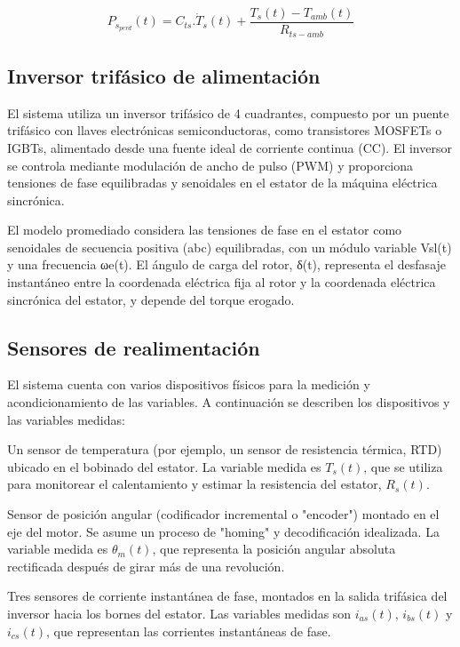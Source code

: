 \documentclass{article}
\begin{document}
    \begin{equation}
        P_{s_{perd}}(t) = C_{ts}.\dot{T}_{s}(t) + \frac{T_{s}(t)-T_{amb}(t)}{R_{ts-amb}}
    \end{equation}

\subsection{Inversor trifásico de alimentación}

El sistema utiliza un inversor trifásico de 4 cuadrantes, compuesto por un puente trifásico con llaves 
electrónicas semiconductoras, como transistores MOSFETs o IGBTs, alimentado desde una fuente ideal de 
corriente continua (CC). El inversor se controla mediante modulación de ancho de pulso (PWM) y proporciona 
tensiones de fase equilibradas y senoidales en el estator de la máquina eléctrica sincrónica.

El modelo promediado considera las tensiones de fase en el estator como senoidales de secuencia positiva 
(abc) equilibradas, con un módulo variable Vsl(t) y una frecuencia ωe(t). El ángulo de carga del rotor, 
δ(t), representa el desfasaje instantáneo entre la coordenada eléctrica fija al rotor y la coordenada 
eléctrica sincrónica del estator, y depende del torque erogado.

\subsection{Sensores de realimentación}

El sistema cuenta con varios dispositivos físicos para la medición y acondicionamiento de las variables. A 
continuación se describen los dispositivos y las variables medidas:

Un sensor de temperatura (por ejemplo, un sensor de resistencia térmica, RTD) ubicado en el bobinado del 
estator. La variable medida es $T_s(t)$, que se utiliza para monitorear el calentamiento y estimar la 
resistencia del estator, $R_s(t)$.

Sensor de posición angular (codificador incremental o "encoder") montado en el eje del motor. Se asume un 
proceso de "homing" y decodificación idealizada. La variable medida es $\theta_m(t)$, que representa la posición 
angular absoluta rectificada después de girar más de una revolución. 

  
Tres sensores de corriente instantánea de fase, montados en la salida trifásica del inversor hacia los 
bornes del estator. Las variables medidas son $i_{as}(t)$, $i_{bs}(t)$ y $i_{cs}(t)$, que representan las corrientes 
instantáneas de fase.
\end{document}

